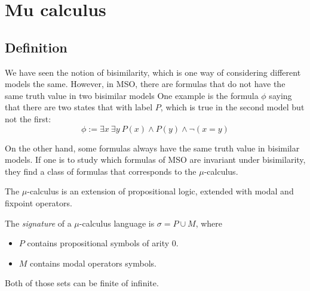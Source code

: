 
\section{Mu calculus}

\subsection{Definition}

We have seen the notion of bisimilarity, which is one way of considering
different models the same. However, in MSO, there are formulas
that do not have the same truth value in two bisimilar models
One example is the formula $\phi$ saying that there are two states that with label $P$,
which is true in the second model but not the first:
\[
    \phi := \exists x~ \exists y~ P(x) \wedge P(y) \wedge \neg (x = y)
\]
    \begin{center}
    \end{center}


On the other hand, some formulas always
have the same truth value in bisimilar models.
If one is to study which formulas of MSO are invariant under bisimilarity,
they find a class of formulas that corresponds to the $\mu$-calculus.

The $\mu$-calculus is an extension of propositional logic,
extended with modal and fixpoint operators.

\begin{definition}
    The \emph{signature} of a $\mu$-calculus language is
    $\sigma = P \cup M$, where
    \begin{itemize}
        \item $P$ contains propositional symbols of arity 0.
        \item $M$ contains modal operators symbols.
    \end{itemize}
    Both of those sets can be finite of infinite.
\end{definition}

